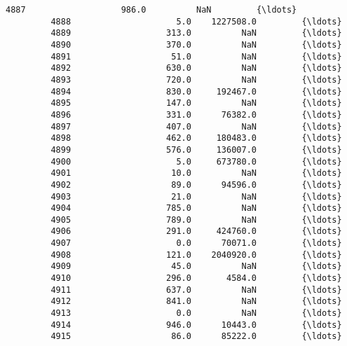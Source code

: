 \documentclass[11pt]{article}
\begin{document}
\begin{Verbatim}[commandchars=\\\{\}]
         4887                   986.0          NaN         {\ldots}            
         4888                     5.0    1227508.0         {\ldots}            
         4889                   313.0          NaN         {\ldots}            
         4890                   370.0          NaN         {\ldots}            
         4891                    51.0          NaN         {\ldots}            
         4892                   630.0          NaN         {\ldots}            
         4893                   720.0          NaN         {\ldots}            
         4894                   830.0     192467.0         {\ldots}            
         4895                   147.0          NaN         {\ldots}            
         4896                   331.0      76382.0         {\ldots}            
         4897                   407.0          NaN         {\ldots}            
         4898                   462.0     180483.0         {\ldots}            
         4899                   576.0     136007.0         {\ldots}            
         4900                     5.0     673780.0         {\ldots}            
         4901                    10.0          NaN         {\ldots}            
         4902                    89.0      94596.0         {\ldots}            
         4903                    21.0          NaN         {\ldots}            
         4904                   785.0          NaN         {\ldots}            
         4905                   789.0          NaN         {\ldots}            
         4906                   291.0     424760.0         {\ldots}            
         4907                     0.0      70071.0         {\ldots}            
         4908                   121.0    2040920.0         {\ldots}            
         4909                    45.0          NaN         {\ldots}            
         4910                   296.0       4584.0         {\ldots}            
         4911                   637.0          NaN         {\ldots}            
         4912                   841.0          NaN         {\ldots}            
         4913                     0.0          NaN         {\ldots}            
         4914                   946.0      10443.0         {\ldots}            
         4915                    86.0      85222.0         {\ldots}            
         

\end{Verbatim}
\end{document}

